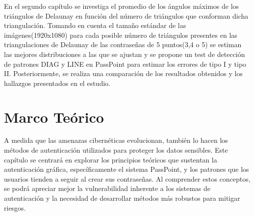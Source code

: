 \documentclass[12pt]{report}
\begin{document}
	En el segundo capítulo se investiga el promedio de los ángulos máximos de los triángulos de Delaunay en función del número de triángulos que conforman dicha triangulación. Tomando en cuenta el tamaño estándar de las imágenes(1920x1080) para cada posible número de triángulos presentes en las triangulaciones de Delaunay de las contraseñas de 5 puntos(3,4 o 5) se estiman las  mejores distribuciones a las que se ajustan y se propone un test de detección de patrones DIAG y LINE en PassPoint para estimar los errores de tipo I y tipo II. Posteriormente, se realiza una comparación de los resultados obtenidos y los hallazgos presentados en el estudio\cite{13}.
	
	
	
	
	

\setcounter{chapter}{0}
\chapter{Marco Teórico}
 A medida que las amenazas cibernéticas evolucionan, también lo hacen los métodos de autenticación utilizados para proteger los datos sensibles. Este capítulo se centrará en explorar los principios teóricos que sustentan la autenticación gráfica, específicamente el sistema PassPoint, y los patrones que los usuarios tienden a seguir al crear sus contraseñas. Al comprender estos conceptos, se podrá apreciar mejor la vulnerabilidad inherente a los sistemas de autenticación y la necesidad de desarrollar métodos más robustos para mitigar riesgos.
\end{document}
